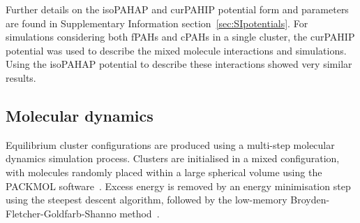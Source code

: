 Further details on the isoPAHAP and curPAHIP potential form and parameters are found in Supplementary Information section~\ref{sec:SIpotentials}. For simulations considering both fPAHs and cPAHs in a single cluster, the curPAHIP potential was used to describe the mixed molecule interactions and simulations. Using the isoPAHAP potential to describe these interactions showed very similar results.


\subsection{Molecular dynamics}
Equilibrium cluster configurations are produced using a multi-step molecular dynamics simulation process. Clusters are initialised in a mixed configuration, with molecules randomly placed within a large spherical volume using the PACKMOL software~\cite{Martinez2009PACKMOL}. Excess energy is removed by an energy minimisation step using the steepest descent algorithm, followed by the low-memory Broyden-Fletcher-Goldfarb-Shanno method~\cite{L-BFGS}.


